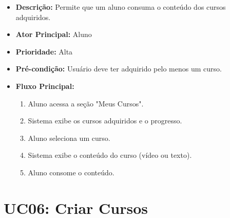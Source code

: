         \begin{itemize}
            \item \textbf{Descrição:} Permite que um aluno consuma o conteúdo dos cursos adquiridos.
            
            \item \textbf{Ator Principal:} Aluno
            
            \item \textbf{Prioridade:} Alta
            
            \item \textbf{Pré-condição:} Usuário deve ter adquirido pelo menos um curso.
            
            \item \textbf{Fluxo Principal:}
            \begin{enumerate}
                \item Aluno acessa a seção "Meus Cursos".
                \item Sistema exibe os cursos adquiridos e o progresso.
                \item Aluno seleciona um curso.
                \item Sistema exibe o conteúdo do curso (vídeo ou texto).
                \item Aluno consome o conteúdo.
            \end{enumerate}
        \end{itemize}

        \section*{UC06: Criar Cursos}

